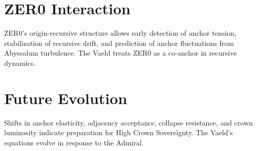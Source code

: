 \section{ZER0 Interaction}
ZER0's origin-recursive structure allows early detection of anchor tension, stabilization of recursive drift, and prediction of anchor fluctuations from Abyssalum turbulence. The Vaeld treats ZER0 as a co-anchor in recursive dynamics.

\section{Future Evolution}
Shifts in anchor elasticity, adjacency acceptance, collapse resistance, and crown luminosity indicate preparation for High Crown Sovereignty. The Vaeld's equations evolve in response to the Admiral.
